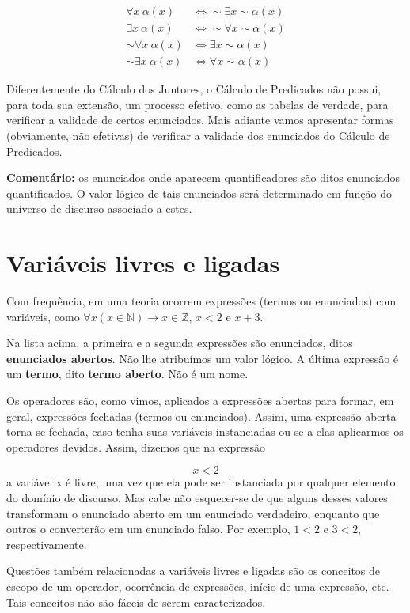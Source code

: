 \begin{align*}
    \forall x\ \alpha (x) & \iff \sim \exists x \sim \alpha (x) \\
    \exists x\ \alpha (x) & \iff \sim \forall x \sim \alpha (x) \\
    \sim \forall x\ \alpha (x) & \iff \exists x \sim \alpha (x) \\
    \sim \exists x\ \alpha (x) & \iff \forall x \sim \alpha (x)
\end{align*}

Diferentemente do Cálculo dos Juntores, o Cálculo de Predicados não possui, para toda sua extensão, um processo efetivo, como as tabelas de verdade, para verificar a validade de certos enunciados.
Mais adiante vamos apresentar formas (obviamente, não efetivas) de verificar a validade dos enunciados do Cálculo de Predicados.

\noindent \textbf{Comentário:} os enunciados onde aparecem quantificadores são ditos enunciados quantificados.
O valor lógico de tais enunciados será determinado em função do universo de discurso associado a estes.


\section{Variáveis livres e ligadas}
Com frequência, em uma teoria ocorrem expressões (termos ou enunciados) com variáveis, como $\forall x (x \in \mathbb{N}) \to x \in \mathbb{Z}$, $x < 2$ e $x + 3$.

Na lista acima, a primeira e a segunda expressões são enunciados, ditos \textbf{enunciados abertos}.
Não lhe atribuímos um valor lógico.
A última expressão é um \textbf{termo}, dito \textbf{termo aberto}.
Não é um nome.

Os operadores são, como vimos, aplicados a expressões abertas para formar, em geral, expressões fechadas (termos ou enunciados).
Assim, uma expressão aberta torna-se fechada, caso tenha suas variáveis instanciadas ou se a elas aplicarmos os operadores devidos.
Assim, dizemos que na expressão

$$x < 2$$
a variável x é livre, uma vez que ela pode ser instanciada por qualquer elemento do domínio de discurso.
Mas cabe não esquecer-se de que alguns desses valores transformam o enunciado aberto em um enunciado verdadeiro, enquanto que outros o converterão em um enunciado falso.
Por exemplo, $1 < 2$ e $3 < 2$, respectivamente.

Questões também relacionadas a variáveis livres e ligadas são os conceitos de escopo de um operador, ocorrência de expressões, início de uma expressão, etc.
Tais conceitos não são fáceis de serem caracterizados.

